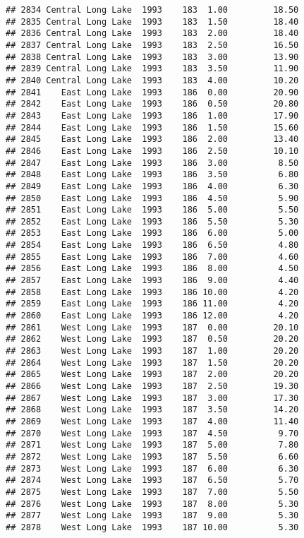 \documentclass[
]{article}
\begin{document}
\begin{verbatim}
## 2834 Central Long Lake  1993    183  1.00         18.50
## 2835 Central Long Lake  1993    183  1.50         18.40
## 2836 Central Long Lake  1993    183  2.00         18.40
## 2837 Central Long Lake  1993    183  2.50         16.50
## 2838 Central Long Lake  1993    183  3.00         13.90
## 2839 Central Long Lake  1993    183  3.50         11.90
## 2840 Central Long Lake  1993    183  4.00         10.20
## 2841    East Long Lake  1993    186  0.00         20.90
## 2842    East Long Lake  1993    186  0.50         20.80
## 2843    East Long Lake  1993    186  1.00         17.90
## 2844    East Long Lake  1993    186  1.50         15.60
## 2845    East Long Lake  1993    186  2.00         13.40
## 2846    East Long Lake  1993    186  2.50         10.10
## 2847    East Long Lake  1993    186  3.00          8.50
## 2848    East Long Lake  1993    186  3.50          6.80
## 2849    East Long Lake  1993    186  4.00          6.30
## 2850    East Long Lake  1993    186  4.50          5.90
## 2851    East Long Lake  1993    186  5.00          5.50
## 2852    East Long Lake  1993    186  5.50          5.30
## 2853    East Long Lake  1993    186  6.00          5.00
## 2854    East Long Lake  1993    186  6.50          4.80
## 2855    East Long Lake  1993    186  7.00          4.60
## 2856    East Long Lake  1993    186  8.00          4.50
## 2857    East Long Lake  1993    186  9.00          4.40
## 2858    East Long Lake  1993    186 10.00          4.20
## 2859    East Long Lake  1993    186 11.00          4.20
## 2860    East Long Lake  1993    186 12.00          4.20
## 2861    West Long Lake  1993    187  0.00         20.10
## 2862    West Long Lake  1993    187  0.50         20.20
## 2863    West Long Lake  1993    187  1.00         20.20
## 2864    West Long Lake  1993    187  1.50         20.20
## 2865    West Long Lake  1993    187  2.00         20.20
## 2866    West Long Lake  1993    187  2.50         19.30
## 2867    West Long Lake  1993    187  3.00         17.30
## 2868    West Long Lake  1993    187  3.50         14.20
## 2869    West Long Lake  1993    187  4.00         11.40
## 2870    West Long Lake  1993    187  4.50          9.70
## 2871    West Long Lake  1993    187  5.00          7.80
## 2872    West Long Lake  1993    187  5.50          6.60
## 2873    West Long Lake  1993    187  6.00          6.30
## 2874    West Long Lake  1993    187  6.50          5.70
## 2875    West Long Lake  1993    187  7.00          5.50
## 2876    West Long Lake  1993    187  8.00          5.30
## 2877    West Long Lake  1993    187  9.00          5.30
## 2878    West Long Lake  1993    187 10.00          5.30

\end{verbatim}
\end{document}
